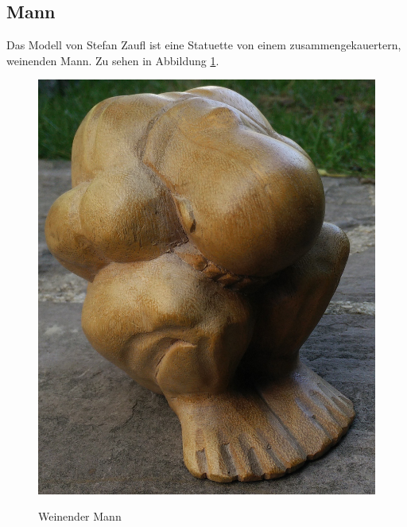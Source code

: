 \documentclass[]{article}
\begin{document}
\subsection{Mann}
Das Modell von Stefan Zaufl ist eine Statuette von einem zusammengekauertern, weinenden Mann. Zu sehen in Abbildung \ref{fig:man:orig}.
\begin{figure}[H]
\caption{Weinender Mann}
\centering
\includegraphics[scale=0.11]{images/Mann_Original.jpg}
\label{fig:man:orig}
\end{figure}
\end{document}
